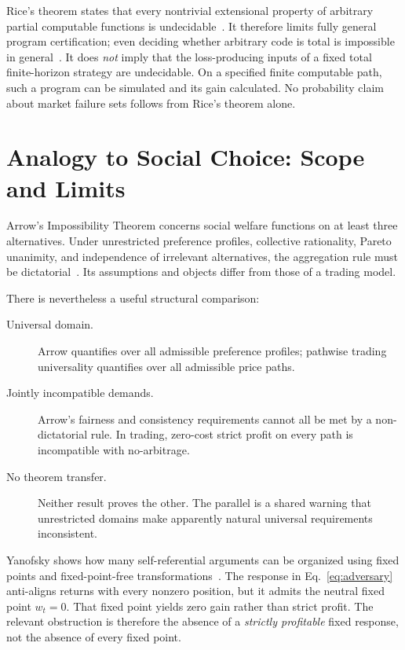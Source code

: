 \documentclass[aps,pra,reprint,superscriptaddress,amsmath,amssymb]{revtex4-2}
\theoremstyle{plain}
\theoremstyle{definition}
\theoremstyle{remark}
\begin{document}
Rice's theorem states that every nontrivial extensional property of arbitrary
partial computable functions is undecidable~\cite{Rice-1953}. It therefore
limits fully general program certification; even deciding whether arbitrary
code is total is impossible in general~\cite{turing-36}. It does \emph{not}
imply that the loss-producing inputs of a fixed total finite-horizon strategy
are undecidable. On a specified finite computable path, such a program can be
simulated and its gain calculated. No probability claim about market failure
sets follows from Rice's theorem alone.

\section{Analogy to Social Choice: Scope and Limits}
\label{sec:arrow}

Arrow's Impossibility Theorem concerns social welfare functions on at least
three alternatives. Under unrestricted preference profiles, collective
rationality, Pareto unanimity, and independence of irrelevant alternatives,
the aggregation rule must be dictatorial~\cite{Arrow1963}. Its assumptions and
objects differ from those of a trading model.

There is nevertheless a useful structural comparison:
\begin{description}
  \item[Universal domain.] Arrow quantifies over all admissible preference
  profiles; pathwise trading universality quantifies over all admissible price
  paths.
  \item[Jointly incompatible demands.] Arrow's fairness and consistency
  requirements cannot all be met by a non-dictatorial rule. In trading,
  zero-cost strict profit on every path is incompatible with no-arbitrage.
  \item[No theorem transfer.] Neither result proves the other. The parallel is
  a shared warning that unrestricted domains make apparently natural
  universal requirements inconsistent.
\end{description}

Yanofsky shows how many self-referential arguments can be organized using
fixed points and fixed-point-free transformations~\cite{Yanofsky-BSL:9051621}.
The response in Eq.~\eqref{eq:adversary} anti-aligns returns with every
nonzero position, but it admits the neutral fixed point \(w_t=0\). That fixed
point yields zero gain rather than strict profit. The relevant obstruction is
therefore the absence of a \emph{strictly profitable} fixed response, not the
absence of every fixed point.
\end{document}
